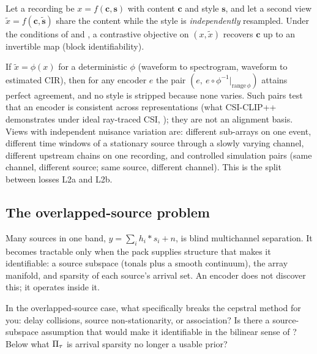 Let a recording be $x=f(\mathbf c,\mathbf s)$ with content $\mathbf c$ and style $\mathbf s$, and let a second view $\tilde x=f(\mathbf c,\tilde{\mathbf s})$ share the content while the style is \emph{independently} resampled. Under the conditions of \citet{vonkugelgen2021} and \citet{gresele2020}, a contrastive objective on $(x,\tilde x)$ recovers $\mathbf c$ up to an invertible map (block identifiability).

\begin{remark}
If $\tilde x=\phi(x)$ for a deterministic $\phi$ (waveform to spectrogram, waveform to estimated CIR), then for any encoder $e$ the pair $(e,\ e\circ\phi^{-1}|_{\mathrm{range}\,\phi})$ attains perfect agreement, and no style is stripped because none varies. Such pairs test that an encoder is consistent across representations (what CSI-CLIP++ demonstrates under ideal ray-traced CSI, \citealp{jiang2026}); they are not an alignment basis. Views with independent nuisance variation are: different sub-arrays on one event, different time windows of a stationary source through a slowly varying channel, different upstream chains on one recording, and controlled simulation pairs (same channel, different source; same source, different channel). This is the split between losses L2a and L2b.
\end{remark}

\subsection{The overlapped-source problem}

Many sources in one band, $y=\sum_i h_i*s_i+n$, is blind multichannel separation. It becomes tractable only when the pack supplies structure that makes it identifiable: a source subspace (tonals plus a smooth continuum), the array manifold, and sparsity of each source's arrival set. An encoder does not discover this; it operates inside it.

\begin{question}
In the overlapped-source case, what specifically breaks the cepstral method for you: delay collisions, source non-stationarity, or association? Is there a source-subspace assumption that would make it identifiable in the bilinear sense of \citet{tian2020}? Below what $\Pi_{\tau}$ is arrival sparsity no longer a usable prior?
\end{question}

